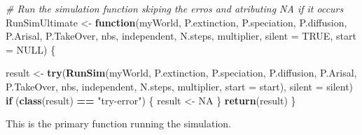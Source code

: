 \documentclass[]{book}
\newenvironment{Shaded}{\begin{snugshade}}{\end{snugshade}}
\newcommand{\KeywordTok}[1]{\textcolor[rgb]{0.13,0.29,0.53}{\textbf{{#1}}}}
\newcommand{\DataTypeTok}[1]{\textcolor[rgb]{0.13,0.29,0.53}{{#1}}}
\newcommand{\StringTok}[1]{\textcolor[rgb]{0.31,0.60,0.02}{{#1}}}
\newcommand{\CommentTok}[1]{\textcolor[rgb]{0.56,0.35,0.01}{\textit{{#1}}}}
\newcommand{\OtherTok}[1]{\textcolor[rgb]{0.56,0.35,0.01}{{#1}}}
\newcommand{\ControlFlowTok}[1]{\textcolor[rgb]{0.13,0.29,0.53}{\textbf{{#1}}}}
\newcommand{\OperatorTok}[1]{\textcolor[rgb]{0.81,0.36,0.00}{\textbf{{#1}}}}
\newcommand{\NormalTok}[1]{{#1}}
\theoremstyle{definition}
\theoremstyle{definition}
\theoremstyle{remark}
\begin{document}
\begin{Shaded}
\begin{Highlighting}[]
\CommentTok{# Run the simulation function skiping the erros and atributing NA if it occurs}
\NormalTok{RunSimUltimate <-}\StringTok{ }\ControlFlowTok{function}\NormalTok{(myWorld, P.extinction, P.speciation,}
\NormalTok{                           P.diffusion, P.Arisal, P.TakeOver, nbs, independent,}
\NormalTok{                           N.steps, multiplier,}
                           \DataTypeTok{silent =} \OtherTok{TRUE}\NormalTok{, }\DataTypeTok{start =} \OtherTok{NULL}\NormalTok{) \{}

\NormalTok{  result <-}\StringTok{ }\KeywordTok{try}\NormalTok{(}\KeywordTok{RunSim}\NormalTok{(myWorld, P.extinction, P.speciation,}
\NormalTok{                       P.diffusion, P.Arisal, P.TakeOver, nbs,}
\NormalTok{                       independent, N.steps,}
\NormalTok{                       multiplier, }\DataTypeTok{start =}\NormalTok{ start), }\DataTypeTok{silent =}\NormalTok{ silent)}
  \ControlFlowTok{if}\NormalTok{ (}\KeywordTok{class}\NormalTok{(result) }\OperatorTok{==}\StringTok{ "try-error"}\NormalTok{) \{}
\NormalTok{    result <-}\StringTok{ }\OtherTok{NA}
\NormalTok{  \}}
  \KeywordTok{return}\NormalTok{(result)}
\NormalTok{\}}
\end{Highlighting}
\end{Shaded}

This is the primary function running the simulation.
\end{document}
